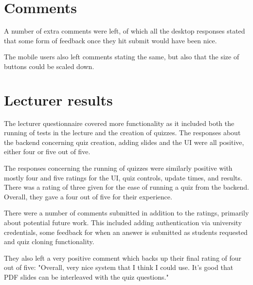 \section{Comments} 
A number of extra comments were left, of which all the desktop responses stated that some form of feedback once they hit submit would have been nice.

The mobile users also left comments stating the same, but also that the size of buttons could be scaled down.

\section{Lecturer results}
The lecturer questionnaire covered more functionality as it included both the running of tests in the lecture and the creation of quizzes. The responses about the backend concerning quiz creation, adding slides and the UI were all positive, either four or five out of five.

The responses concerning the running of quizzes were similarly positive with mostly four and five ratings for the UI, quiz controls, update times, and results. There was a rating of three given for the ease of running a quiz from the backend. Overall, they gave a four out of five for their experience.

There were a number of comments submitted in addition to the ratings, primarily about potential future work. This included adding authentication via university credentials, some feedback for when an answer is submitted as students requested and quiz cloning functionality. 

They also left a very positive comment which backs up their final rating of four out of five: "Overall, very nice system that I think I could use. It's good that PDF slides can be interleaved with the quiz questions."